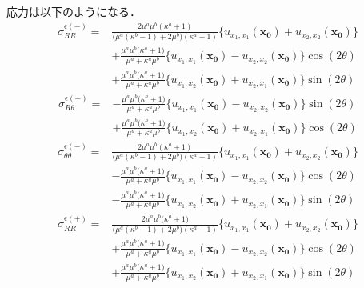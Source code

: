 応力は以下のようになる．
\begin{align}
	\sigma_{RR}^{\epsilon(-)} =
	&\frac{2\mu^{a}\mu^{b}(\kappa^{a}+1)}{\bigl(\mu^{a}(\kappa^{b}-1)+2\mu^{b}\bigr)(\kappa^{a}-1)}
	\bigl\{u_{x_{1},x_{1}}(\bm{x_{0}})+u_{x_{2},x_{2}}(\bm{x_{0}})\bigr\}
	\nonumber
	\\
	&+\frac{\mu^{a}\mu^{b}\bigl(\kappa^{a}+1\bigr)}{\mu^{a}+\kappa^{a}\mu^{b}}
	\bigl\{u_{x_{1},x_{1}}(\bm{x_{0}})-u_{x_{2},x_{2}}(\bm{x_{0}})\bigr\}\cos(2\theta)
	\nonumber
	\\
	&+\frac{\mu^{a}\mu^{b}\bigl(\kappa^{a}+1\bigr)}{\mu^{a}+\kappa^{a}\mu^{b}}
	\bigl\{u_{x_{1},x_{2}}(\bm{x_{0}})+u_{x_{2},x_{1}}(\bm{x_{0}})\bigr\}\sin(2\theta)
	\label{eq:SigmaRRInEpsSol}
\end{align}
\begin{align}
	\sigma_{R\theta}^{\epsilon(-)} =
	&-\frac{\mu^{a}\mu^{b}\bigl(\kappa^{a}+1\bigr)}{\mu^{a}+\kappa^{a}\mu^{b}}
	\bigl\{u_{x_{1},x_{1}}(\bm{x_{0}})-u_{x_{2},x_{2}}(\bm{x_{0}})\bigr\}\sin(2\theta)
	\nonumber
	\\
	&+\frac{\mu^{a}\mu^{b}\bigl(\kappa^{a}+1\bigr)}{\mu^{a}+\kappa^{a}\mu^{b}}
	\bigl\{u_{x_{1},x_{2}}(\bm{x_{0}})+u_{x_{2},x_{1}}(\bm{x_{0}})\bigr\}\cos(2\theta)
	\label{eq:SigmaRThInEpsSol}
\end{align}
\begin{align}
	\sigma_{\theta\theta}^{\epsilon(-)} =
	&\frac{2\mu^{a}\mu^{b}(\kappa^{a}+1)}{\bigl(\mu^{a}(\kappa^{b}-1)+2\mu^{b}\bigr)(\kappa^{a}-1)}
	\bigl\{u_{x_{1},x_{1}}(\bm{x_{0}})+u_{x_{2},x_{2}}(\bm{x_{0}})\bigr\}
	\nonumber
	\\
	&-\frac{\mu^{a}\mu^{b}\bigl(\kappa^{a}+1\bigr)}{\mu^{a}+\kappa^{a}\mu^{b}}
	\bigl\{u_{x_{1},x_{1}}(\bm{x_{0}})-u_{x_{2},x_{2}}(\bm{x_{0}})\bigr\}\cos(2\theta)
	\nonumber
	\\
	&-\frac{\mu^{a}\mu^{b}\bigl(\kappa^{a}+1\bigr)}{\mu^{a}+\kappa^{a}\mu^{b}}
	\bigl\{u_{x_{1},x_{2}}(\bm{x_{0}})+u_{x_{2},x_{1}}(\bm{x_{0}})\bigr\}\sin(2\theta)
	\label{eq:SigmaThThInEpsSol}
\end{align}
\begin{align}
	\sigma_{RR}^{\epsilon(+)}
	=&\frac{ 2\mu^{a}\mu^{b}\bigl(\kappa^{a}+1\bigr)　}
		{\bigl(\mu^{a}(\kappa^{b}-1)+2\mu^{b}\bigr)(\kappa^{a}-1)}
	\bigl\{u_{x_{1},x_{1}}(\bm{x_{0}})+u_{x_{2},x_{2}}(\bm{x_{0}})\bigr\}
	\nonumber
	\\
	&+\frac{\mu^{a}\mu^{b}\bigl(\kappa^{a}+1\bigr)}{\mu^{a}+\kappa^{a}\mu^{b}}
	\bigl\{u_{x_{1},x_{1}}(\bm{x_{0}})-u_{x_{2},x_{2}}(\bm{x_{0}})\bigr\}\cos(2\theta)
	\nonumber
	\\
	&+\frac{\mu^{a}\mu^{b}\bigl(\kappa^{a}+1\bigr)}{\mu^{a}+\kappa^{a}\mu^{b}}
	\bigl\{u_{x_{1},x_{2}}(\bm{x_{0}})+u_{x_{2},x_{1}}(\bm{x_{0}})\bigr\}\sin(2\theta)
	\label{eq:eRROutEpsSol}
\end{align}
